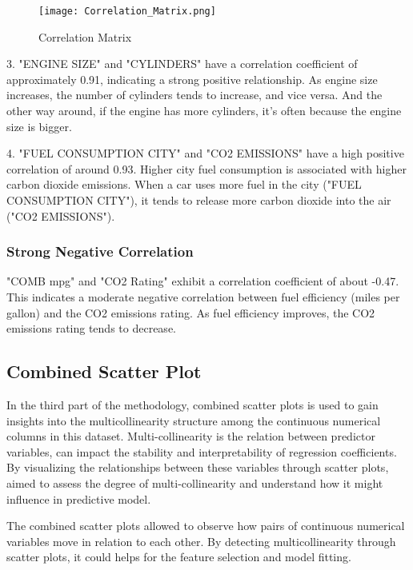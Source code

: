 \documentclass[12pt, a4paper,oneside]{book}
\numberwithin{equation}{section}
\begin{document}
 \begin{figure}[H]
\centerline{\texttt{[image: Correlation\_Matrix.png]}}
\caption{Correlation Matrix}
\label{fig:4.2}
\end{figure}
\newline

3. "ENGINE SIZE" and "CYLINDERS" have a correlation coefficient of approximately 0.91, indicating a strong positive relationship. As engine size increases, the number of cylinders tends to increase, and vice versa. And the other way around, if the engine has more cylinders, it's often because the engine size is bigger.

4. "FUEL CONSUMPTION CITY" and "CO2 EMISSIONS" have a high positive correlation of around 0.93. Higher city fuel consumption is associated with higher carbon dioxide emissions. When a car uses more fuel in the city ("FUEL CONSUMPTION CITY"), it tends to release more carbon dioxide into the air ("CO2 EMISSIONS").

\subsubsection{Strong Negative Correlation}
"COMB mpg" and "CO2 Rating" exhibit a correlation coefficient of about -0.47. This indicates a moderate negative correlation between fuel efficiency (miles per gallon) and the CO2 emissions rating. As fuel efficiency improves, the CO2 emissions rating tends to decrease.




\subsection{Combined Scatter Plot}

In the third part of the methodology, combined scatter plots is used to gain insights into the multicollinearity structure among the continuous numerical columns in this dataset. Multi-collinearity is the relation between predictor variables, can impact the stability and interpretability of regression coefficients. By visualizing the relationships between these variables through scatter plots, aimed to assess the degree of multi-collinearity and understand how it might influence in predictive model.

The combined scatter plots allowed  to observe how pairs of continuous numerical variables move in relation to each other. By detecting multicollinearity through scatter plots, it could helps for the feature selection and model fitting. 
\end{document}
